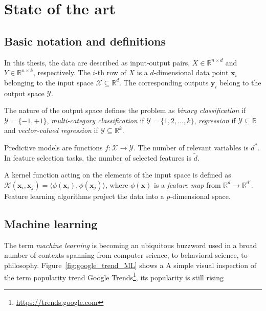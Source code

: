 
\chapter{State of the art} \label{chap:state-of-the-art}

\section{Basic notation and definitions} \label{sec:notation}
In this thesis, the data are described as input-output pairs, $X \in \mathbb{R}^{n \times d}$ and $Y \in \mathbb{R}^{n \times k}$, respectively.
The $i$-th row of $X$ is a $d$-dimensional data point $\bm{x}_{i}$ belonging to the input space $\mathcal{X}\subseteq\mathds{R}^d$. The corresponding outputs $\bm{y}_{i}$ belong to the output space $\mathcal{Y}$.

The nature of the output space defines the problem as {\sl binary classification} if  $\mathcal{Y} = \{-1,+1\}$, {\sl multi-category classification} if $\mathcal{Y} = \{1,2,\dots,k\}$, {\sl regression} if $\mathcal{Y}\subseteq\mathds{R}$ and {\sl vector-valued regression} if $\mathcal{Y}\subseteq\mathds{R}^k$.

Predictive models are functions $f: \mathcal{X} \rightarrow \mathcal{Y}$.
The number of relevant variables is $d^*$.
In feature selection tasks, the number of selected features is $\tilde d$.

A kernel function acting on the elements of the input space is defined as $\mathcal{K}(\bm{x}_{i},\bm{x}_{j})=\langle \phi(\bm{x}_{i}), \phi(\bm{x}_{j})\rangle$, where $\phi(\bm{x})$ is a {\em feature map} from $\mathds{R}^d \rightarrow \mathds{R}^{d'}$.
Feature learning algorithms project the data into a $p$-dimensional space.

\section{Machine learning} \label{sec:machine_learning}

The term \textit{machine learning} is becoming an ubiquitous buzzword used in a broad number of contexts spanning from computer science, to behavioral science, to philosophy. Figure~\ref{fig:google_trend_ML} shows a A simple visual inspection of the term popularity trend Google Trends\footnote{\url{https://trends.google.com}}, its popularity is still rising


